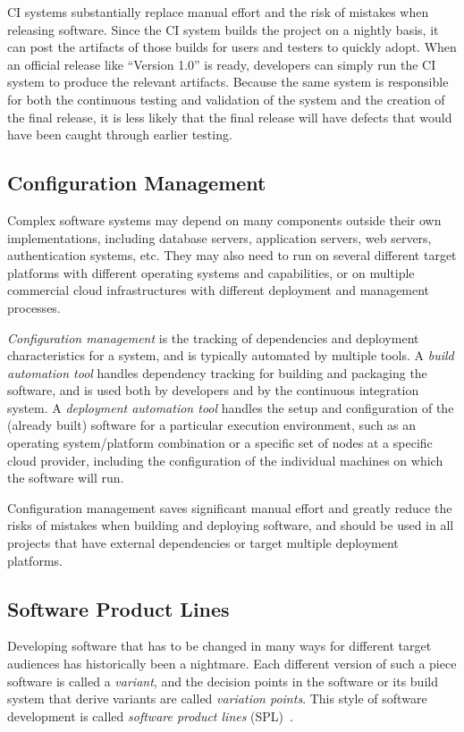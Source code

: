 CI systems substantially replace manual effort and the risk of
mistakes when releasing software. Since the CI system builds the
project on a nightly basis, it can post the artifacts of those builds
for users and testers to quickly adopt. When an official release like
``Version 1.0'' is ready, developers can simply run the CI system to
produce the relevant artifacts. Because the same system is responsible
for both the continuous testing and validation of the system and the
creation of the final release, it is less likely that the final
release will have defects that would have been caught through earlier
testing.

\subsection{Configuration Management}

Complex software systems may depend on many components outside their
own implementations, including database servers, application servers,
web servers, authentication systems, etc. They may also need to run on
several different target platforms with different operating systems
and capabilities, or on multiple commercial cloud infrastructures with
different deployment and management processes.

\emph{Configuration management} is the tracking of dependencies and
deployment characteristics for a system, and is typically automated by
multiple tools. A \emph{build automation tool} handles dependency
tracking for building and packaging the software, and is used both by
developers and by the continuous integration system. A
\emph{deployment automation tool} handles the setup and configuration
of the (already built) software for a particular execution
environment, such as an operating system/platform combination or a
specific set of nodes at a specific cloud provider, including the
configuration of the individual machines on which the software will
run.

Configuration management saves significant manual effort and greatly
reduce the risks of mistakes when building and deploying software, and
should be used in all projects that have external dependencies or
target multiple deployment platforms.

\subsection{Software Product Lines}

Developing software that has to be changed in many ways for different
target audiences has historically been a nightmare.  Each different
version of such a piece software is called a \emph{variant}, and the
decision points in the software or its build system that derive
variants are called \emph{variation points}. This style of software
development is called \emph{software product lines}
(SPL)~\cite{czarnecki2005model,clements2002software}.

